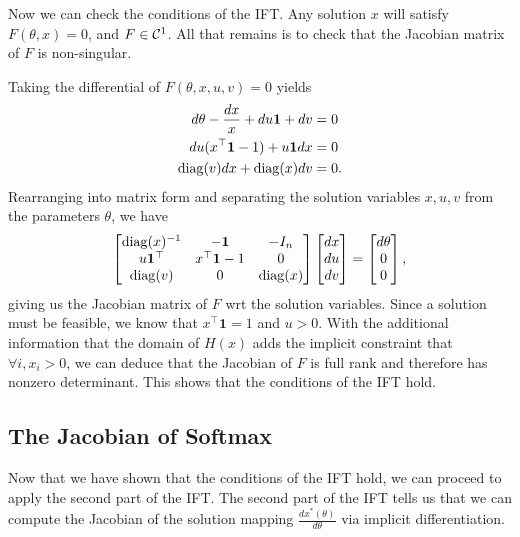 \documentclass[11pt]{article}
\begin{document}
Now we can check the conditions of the IFT.
Any solution $x$ will satisfy $F(\theta, x) = 0$,
and $F \in \mathcal{C}^1$.
All that remains is to check that the Jacobian matrix of $F$ is non-singular.

Taking the differential of $F(\theta,x,u,v) = 0$ yields
\begin{equation}
\label{eqn:dsystem}
\begin{aligned}
d\theta - \frac{dx}{x} + du\mathbf{1} + dv &= 0\\
du(x^\top \mathbf{1} - 1) + u\mathbf{1}dx &= 0\\
\mathrm{diag}(v)dx + \mathrm{diag}(x)dv &= 0.
\end{aligned}
\end{equation}
Rearranging into matrix form and separating the solution variables $x,u,v$
from the parameters $\theta$, we have
\begin{equation}
\label{eqn:dsystem-matrix}
\begin{bmatrix}
\mathrm{diag}(x)^{-1} & -\mathbf{1} & -I_n \\
u\mathbf{1}^\top & x^\top\mathbf{1} - 1 & 0\\
\mathrm{diag}(v) & 0 & \mathrm{diag}(x)
\end{bmatrix}
\begin{bmatrix}
dx \\ du \\ dv
\end{bmatrix}
=   
\begin{bmatrix}
d\theta \\ 0 \\ 0
\end{bmatrix},
\end{equation}
giving us the Jacobian matrix of $F$ wrt the solution variables.
Since a solution must be feasible, we know that $x^\top\mathbf{1} = 1$ and $u > 0$.
With the additional information that the domain of $H(x)$
adds the implicit constraint that $\forall i, x_i > 0$,
we can deduce that the Jacobian of $F$ is full rank and therefore has nonzero determinant.
This shows that the conditions of the IFT hold.

\subsection{The Jacobian of Softmax}
Now that we have shown that the conditions of the IFT hold,
we can proceed to apply the second part of the IFT.
The second part of the IFT tells us that we can compute the Jacobian of the
solution mapping $\frac{dx^*(\theta)}{d\theta}$ via implicit differentiation.
\end{document}
